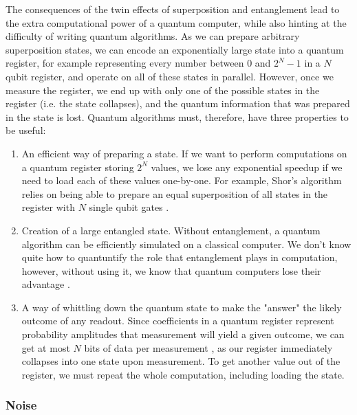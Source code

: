 The consequences of the twin effects of superposition and entanglement lead to the extra computational
power of a quantum computer, while also hinting at the difficulty of writing quantum algorithms. As we
can prepare arbitrary superposition states, we can encode an exponentially large
state into a quantum register, for example representing every number between 0 and $2^N-1$ in a $N$ qubit
register, and operate on all of these states in parallel. However, once we measure the register, we end up
with only one of the possible states in the register (i.e. the state collapses), and the quantum information
that was prepared in the state is lost. Quantum algorithms must, therefore, have three properties to be useful:
\begin{enumerate}
  \item An efficient way of preparing a state. If we want to perform computations on a quantum register
    storing $2^N$ values, we lose any exponential speedup if we need to load each of these values one-by-one.
    For example, Shor's algorithm relies on being able to prepare an equal superposition of all states
    in the register with $N$ single qubit gates \cite{PhysRevA.54.1034}.
  \item Creation of a large entangled state. Without entanglement, a quantum algorithm can be efficiently
    simulated on a classical computer. We don't know quite how to quantuntify the role that entanglement plays in computation,
    however, without using it, we know that quantum computers lose their advantage \cite{doi:10.1098/rspa.2002.1097}.
  \item A way of whittling down the quantum state to make the "answer" the likely outcome of any readout.
    Since coefficients in a quantum register represent probability amplitudes that measurement will yield
    a given outcome, we can get at most $N$ bits of data per measurement \cite{651037}, as our register
    immediately collapses into one state upon measurement. To get another value out of the register,
    we must repeat the whole computation, including loading the state.
\end{enumerate}

\subsubsection{Noise}

